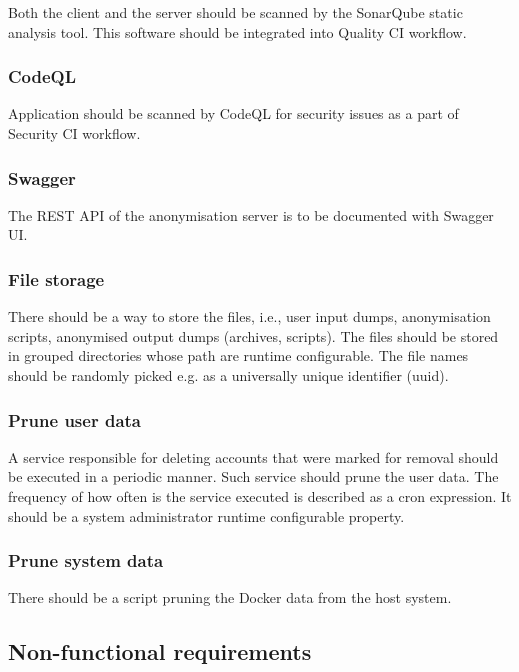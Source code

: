 \documentclass[a4paper,twoside,12pt]{book}
\begin{document}
Both the client and the server should be scanned by the SonarQube static analysis tool. This software should be integrated into Quality CI workflow.

\subsubsection{CodeQL}

Application should be scanned by CodeQL for security issues as a part of Security CI workflow.

\subsubsection{Swagger}

The REST API of the anonymisation server is to be documented with Swagger UI.

\subsubsection{File storage}

There should be a way to store the files, i.e., user input dumps, anonymisation scripts, anonymised output dumps (archives, scripts). The files should be stored in grouped directories whose path are runtime configurable. The file names should be randomly picked e.g. as a universally unique identifier (uuid).

\subsubsection{Prune user data}

A service responsible for deleting accounts that were marked for removal should be executed in a periodic manner. Such service should prune the user data. The frequency of how often is the service executed is described as a cron expression. It should be a system administrator runtime configurable property.

\subsubsection{Prune system data}

There should be a script pruning the Docker data from the host system.


\subsection{Non-functional requirements}
\end{document}
